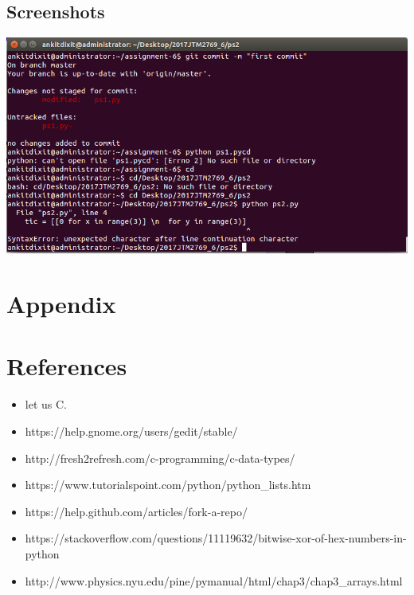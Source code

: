 \documentclass[12]{article}
\begin{document}
\subsection{Screenshots}
\includegraphics[scale=0.5]{ps2.png}

\newpage
\section*{Appendix}

\newpage
\section{References}
\begin{itemize}
\item let us C.
\item https://help.gnome.org/users/gedit/stable/
\item http://fresh2refresh.com/c-programming/c-data-types/
\item https://www.tutorialspoint.com/python/python_lists.htm
\item https://help.github.com/articles/fork-a-repo/
\item https://stackoverflow.com/questions/11119632/bitwise-xor-of-hex-numbers-in-python
\item http://www.physics.nyu.edu/pine/pymanual/html/chap3/chap3_arrays.html
\end{itemize}
\end{document}
